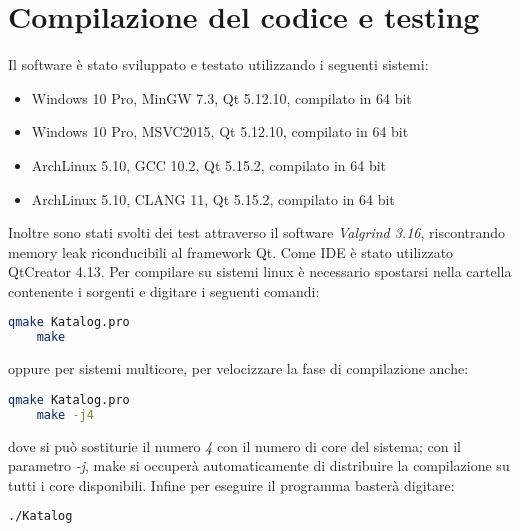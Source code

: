 \section{Compilazione del codice e testing}

Il software è stato sviluppato e testato utilizzando i seguenti sistemi:
\begin{itemize}
    \item Windows 10 Pro, MinGW 7.3, Qt 5.12.10, compilato in 64 bit
    \item Windows 10 Pro, MSVC2015, Qt 5.12.10, compilato in 64 bit
    \item ArchLinux 5.10, GCC 10.2, Qt 5.15.2, compilato in 64 bit
    \item ArchLinux 5.10, CLANG 11, Qt 5.15.2, compilato in 64 bit
\end{itemize}
Inoltre sono stati svolti dei test attraverso il software \emph{Valgrind 3.16}, riscontrando memory leak riconducibili al framework Qt.
Come IDE è stato utilizzato QtCreator 4.13.
\newline 
Per compilare su sistemi linux è necessario spostarsi nella cartella contenente i sorgenti e digitare i seguenti comandi:
\begin{lstlisting}[language=bash]
    qmake Katalog.pro
    make
\end{lstlisting}
oppure per sistemi multicore, per velocizzare la fase di compilazione anche:
\begin{lstlisting}[language=bash]
    qmake Katalog.pro
    make -j4
\end{lstlisting}
dove si può sostiturie il numero \emph{4} con il numero di core del sistema; con il parametro \emph{-j}, make si occuperà automaticamente di 
distribuire la compilazione su tutti i core disponibili. Infine per eseguire il programma basterà digitare:
\begin{lstlisting}[language=bash]
    ./Katalog
\end{lstlisting}